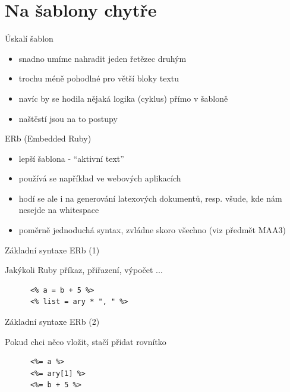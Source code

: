 \documentclass{beamer}
\begin{document}
\section{Na šablony chytře}

\begin{frame}{Úskalí šablon}
  \begin{itemize}
    \item snadno umíme nahradit jeden řetězec druhým
    \item trochu méně pohodlné pro větší bloky textu
    \item navíc by se hodila nějaká logika (cyklus) přímo v šabloně
    \item naštěstí jsou na to postupy
  \end{itemize}
\end{frame}

\begin{frame}{ERb (Embedded Ruby)}
  \begin{itemize}
    \item lepší šablona - ``aktivní text''
    \item používá se například ve webových aplikacích
    \item hodí se ale i na generování latexových dokumentů, resp. všude, kde nám nesejde na whitespace
    \item poměrně jednoduchá syntax, zvládne skoro všechno (viz předmět MAA3)
  \end{itemize}
\end{frame}


\begin{frame}[fragile]{Základní syntaxe ERb (1)}
  \begin{block}{ }
    Jakýkoli Ruby příkaz, přiřazení, výpočet ...
    \scriptsize
    \begin{verbatim}
      <% a = b + 5 %>
      <% list = ary * ", " %>
    \end{verbatim}
  \end{block}
\end{frame}

\begin{frame}[fragile]{Základní syntaxe ERb (2)}
  \begin{block}{ }
    Pokud chci něco vložit, stačí přidat rovnítko
    \scriptsize
    \begin{verbatim}
      <%= a %>
      <%= ary[1] %>
      <%= b + 5 %>
    \end{verbatim}
  \end{block}
\end{frame}
\end{document}
